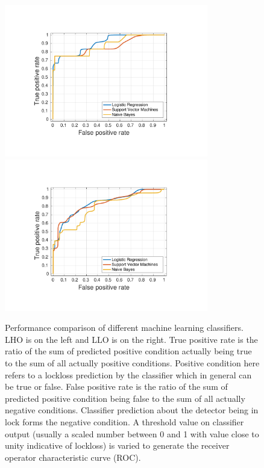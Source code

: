 \documentclass[twocolumn, aps, superscriptaddress]{revtex4}
\begin{document}
\begin{figure}[t]
\hspace*{-0.5cm}
 \includegraphics[width=3.5in, trim = 2.5cm 1.5cm 2.5cm 1.5cm, clip=true]{lho_lockloss_ROC.pdf}
  \includegraphics[width=3.5in, trim = 2.5cm 1.5cm 2.5cm 1.5cm, clip=true]{llo_lockloss_ROC.pdf}
 \caption{Performance comparison of different machine learning classifiers. LHO is on the left and LLO is on the right. True positive rate is the ratio of the sum of predicted positive condition actually being true to the sum of all actually positive conditions. Positive condition here refers to a lockloss prediction by the classifier which in general can be true or false. False positive rate is the ratio of the sum of predicted positive condition being false to the sum of all actually negative conditions. Classifier prediction about the detector being in lock forms the negative condition. A threshold value on classifier output (usually a scaled number between 0 and 1 with value close to unity indicative of lockloss) is varied to generate the receiver operator characteristic curve (ROC).
 }
 \label{fig:MLA_comparison}
\end{figure}
\end{document}
